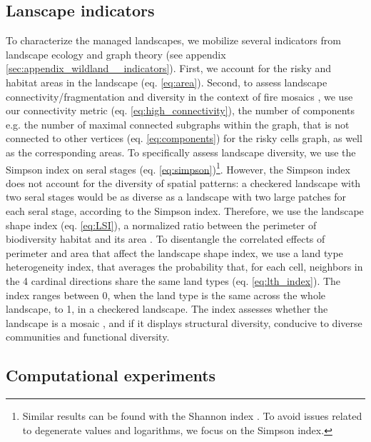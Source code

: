 \subsection{Lanscape indicators}
\label{section:indicators}
To characterize the managed landscapes, we mobilize several indicators from landscape ecology and graph theory (see appendix \ref{sec:appendix_wildland__indicators}).
First, we account for the risky and habitat areas in the landscape (eq. \ref{eq:area}). Second, to assess landscape connectivity/fragmentation and diversity in the context of fire mosaics \citep{bradstock_which_2005}, we use our connectivity metric (eq. \ref{eq:high_connectivity}), the number of components e.g. the number of maximal connected subgraphs within the graph, that is not connected to other vertices (eq. \ref{eq:components}) for the risky cells graph, as well as the corresponding areas. To specifically assess landscape diversity, we use the Simpson index \citep{simpson_measurement_1949} on seral stages (eq. \ref{eq:simpson})\footnote{Similar results can be found with the Shannon index \citep{Shannon1949}. To avoid issues related to degenerate values and logarithms, we focus on the Simpson index.}. However, the Simpson index does not account for the diversity of spatial patterns: a checkered landscape with two seral stages would be as diverse as a landscape with two large patches for each seral stage, according to the Simpson index. Therefore, we use the landscape shape index (eq. \ref{eq:LSI}), a normalized ratio between the perimeter of biodiversity habitat and its area \citep{patton_diversity_1975, McGarigal_1995}. To disentangle the correlated effects of perimeter and area that affect the landscape shape index, we use a land type heterogeneity index, that averages the probability that, for each cell, neighbors in the 4 cardinal directions share the same land types (eq. \ref{eq:lth_index}). The index ranges between 0, when the land type is the same across the whole landscape, to 1, in a checkered landscape. The index assesses whether the landscape is a mosaic \citep{bradstock_which_2005}, and if it displays structural diversity, conducive to diverse communities and functional diversity. 

\subsection{Computational experiments}

